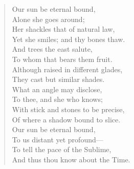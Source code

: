 \begingroup
	\fontsize{10pt}{12pt}\selectfont
		\begin{quote}
			Our sun be eternal bound,\\
			Alone she goes around;\\
			Her shackles that of natural law,\\%
			Yet she smiles; and thy bones thaw.\\

			And trees the east salute,\\
			To whom that bears them fruit.\\
			Although raised in different glades,\\
			They cast but similar shades.\\

			What an angle may disclose,\\
			To thee, and she who knows;\\ %
			With stick and stones to be precise,\\
			Of where a shadow bound to slice.\\
			
			Our sun be eternal bound,\\
			To us distant yet profound---\\
			To tell the pace of the Sublime,\\
			And thus thou know about the Time.\\
		\end{quote} 
\endgroup





